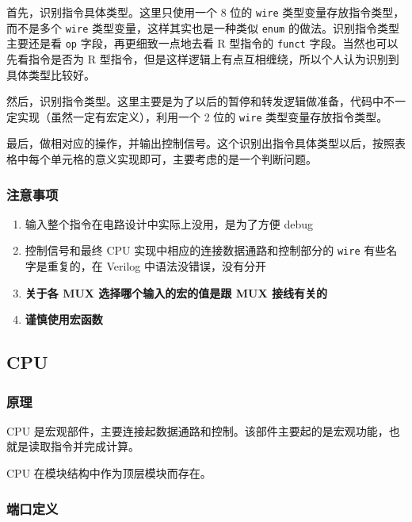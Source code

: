 首先，识别指令具体类型。这里只使用一个 8 位的 \texttt{wire}
类型变量存放指令类型，而不是多个 \texttt{wire}
类型变量，这样其实也是一种类似 \texttt{enum}
的做法。识别指令类型主要还是看 \texttt{op} 字段，再更细致一点地去看 R
型指令的 \texttt{funct} 字段。当然也可以先看指令是否为 R
型指令，但是这样逻辑上有点互相缠绕，所以个人认为识别到具体类型比较好。

然后，识别指令类型。这里主要是为了以后的暂停和转发逻辑做准备，代码中不一定实现（虽然一定有宏定义），利用一个
2 位的 \texttt{wire} 类型变量存放指令类型。

最后，做相对应的操作，并输出控制信号。这个识别出指令具体类型以后，按照表格中每个单元格的意义实现即可，主要考虑的是一个判断问题。

\hypertarget{ux6ce8ux610fux4e8bux9879-7}{%
\subsubsection{注意事项}\label{ux6ce8ux610fux4e8bux9879-7}}

\begin{enumerate}
\def\labelenumi{\arabic{enumi}.}
\tightlist
\item
  输入整个指令在电路设计中实际上没用，是为了方便 debug
\item
  控制信号和最终 CPU 实现中相应的连接数据通路和控制部分的 \texttt{wire}
  有些名字是重复的，在 Verilog 中语法没错误，没有分开
\item
  \textbf{关于各 MUX 选择哪个输入的宏的值是跟 MUX 接线有关的}
\item
  \textbf{谨慎使用宏函数}
\end{enumerate}

\hypertarget{cpu}{%
\subsection{CPU}\label{cpu}}

\hypertarget{ux539fux7406-5}{%
\subsubsection{原理}\label{ux539fux7406-5}}

CPU
是宏观部件，主要连接起数据通路和控制。该部件主要起的是宏观功能，也就是读取指令并完成计算。

CPU 在模块结构中作为顶层模块而存在。

\hypertarget{ux7aefux53e3ux5b9aux4e49-7}{%
\subsubsection{端口定义}\label{ux7aefux53e3ux5b9aux4e49-7}}

